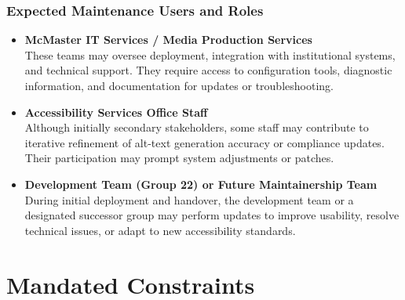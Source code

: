\documentclass[12pt]{article}
\begin{document}
\subsubsection*{Expected Maintenance Users and Roles}
\begin{itemize}
  \item \textbf{McMaster IT Services / Media Production Services} \\
    These teams may oversee deployment, integration with
    institutional systems, and technical support. They require access
    to configuration tools, diagnostic information, and documentation
    for updates or troubleshooting.
  \item \textbf{Accessibility Services Office Staff} \\
    Although initially secondary stakeholders, some staff may
    contribute to iterative refinement of alt-text generation
    accuracy or compliance updates. Their participation may prompt
    system adjustments or patches.
  \item \textbf{Development Team (Group 22) or Future Maintainership Team} \\
    During initial deployment and handover, the development team or a
    designated successor group may perform updates to improve
    usability, resolve technical issues, or adapt to new
    accessibility standards.
\end{itemize}

\section{Mandated Constraints}
\end{document}
